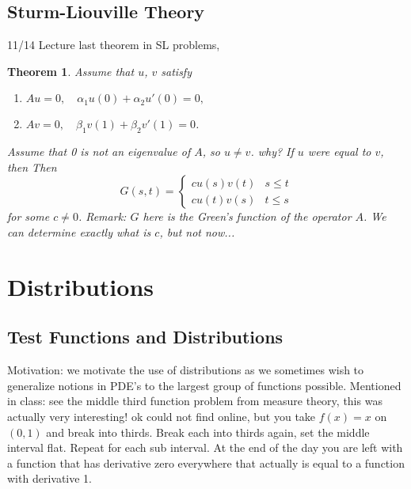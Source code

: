 \documentclass[letterpaper,twoside,11pt]{article}
\theoremstyle{mystyle}
\newtheorem{theorem}{Theorem}[section]
\newcommand{\cg}{\color{gray}}
\newcommand{\cbk}{\color{black}}
\newcommand{\cred}{\color{red}}
\begin{document}
\subsection{Sturm-Liouville Theory}














\cred
11/14 Lecture last theorem in SL problems, \cbk 
\begin{tcolorbox}[colback=red!5!white,colframe=red!75!black]
\begin{theorem}
  Assume that $u$, $v$ satisfy 
  \begin{enumerate}
    \item $Au = 0,\quad \alpha_1 u(0) + \alpha_2 u'(0) =0, $
    \item $Av=0, \quad \beta_1 v(1) + \beta_2 v'(1) = 0$. 
  \end{enumerate}
  Assume that 0 is not an eigenvalue of $A$, so $u\neq v$. \cg why? If $u$ were equal to $v$, then \cbk Then 
  \[G\left( {s,t} \right) = \left\{ {\begin{array}{*{20}{c}}
    {cu(s)v(t)}&{s\leq t} \\[.25cm] 
    {cu(t)v(s)}&{t \leq s} 
  \end{array}} \right.\]
  for some $c\neq 0$. \cg Remark: $G$ here is the Green's function of the operator $A$. We can determine exactly what is $c$, but not now...\cbk 
\end{theorem}
\end{tcolorbox}


\newpage \section{Distributions}
\subsection{Test Functions and Distributions}
Motivation: we motivate the use of distributions as we sometimes wish to generalize notions in PDE's to the largest group of functions possible. \cg Mentioned in class: see the middle third function problem from measure theory, this was actually very interesting! ok could not find online, but you take $f(x) = x$ on $(0,1)$ and break into thirds. Break each into thirds again, set the middle interval flat. Repeat for each sub interval. At the end of the day you are left with a function that has derivative zero everywhere that actually is equal to a function with derivative 1. \cbk 
\end{document}
